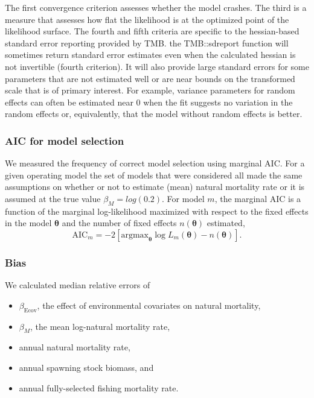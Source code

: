 \documentclass[
  12pt,
]{article}
\begin{document}
The first convergence criterion assesses whether the model crashes. The
third is a measure that assesses how flat the likelihood is at the
optimized point of the likelihood surface. The fourth and fifth criteria
are specific to the hessian-based standard error reporting provided by
TMB. the TMB::sdreport function will sometimes return standard error
estimates even when the calculated hessian is not invertible (fourth
criterion). It will also provide large standard errors for some
parameters that are not estimated well or are near bounds on the
transformed scale that is of primary interest. For example, variance
parameters for random effects can often be estimated near 0 when the fit
suggests no variation in the random effects or, equivalently, that the
model without random effects is better.

\hypertarget{aic-for-model-selection}{%
\subsubsection*{AIC for model selection}\label{aic-for-model-selection}}

We measured the frequency of correct model selection using marginal AIC.
For a given operating model the set of models that were considered all
made the same assumptions on whether or not to estimate (mean) natural
mortality rate or it is assumed at the true value
\(\beta_M = log(0.2)\). For model \(m\), the marginal AIC is a function
of the marginal log-likelihood maximized with respect to the fixed
effects in the model \(\boldsymbol{\theta}\) and the number of fixed
effects \(n\left(\boldsymbol{\theta}\right)\) estimated, \[
\text{AIC}_m = -2\left[{\text{argmax}}_{\boldsymbol{\theta}} \log L_m\left({\boldsymbol{\theta}}\right) - n\left({\boldsymbol{\theta}}\right)\right].
\]

\hypertarget{bias}{%
\subsubsection*{Bias}\label{bias}}

We calculated median relative errors of

\begin{itemize}
\item $\beta_\text{Ecov}$, the effect of environmental covariates on natural mortality, 
\item $\beta_M$, the mean log-natural mortality rate,
\item annual natural mortality rate,
\item annual spawning stock biomass, and
\item annual fully-selected fishing mortality rate.
\end{itemize}
\end{document}
